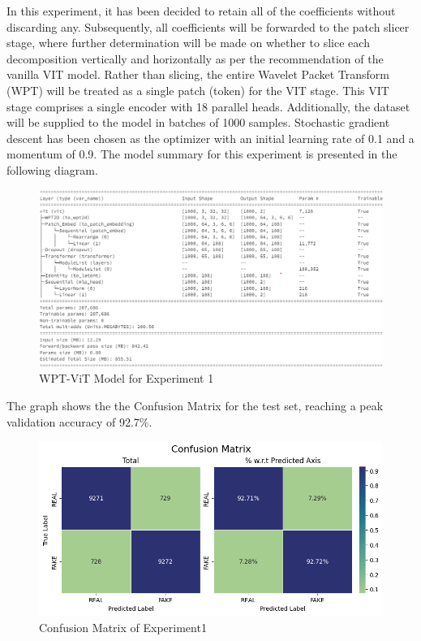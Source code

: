 \documentclass{svproc}
\begin{document}
\noindent
In this experiment, it has been decided to retain all of the coefficients without discarding any. Subsequently, all coefficients will be forwarded to the patch slicer stage, where further determination will be made on whether to slice each decomposition vertically and horizontally as per the recommendation of the vanilla VIT model. Rather than slicing, the entire Wavelet Packet Transform (WPT) will be treated as a single patch (token) for the VIT stage. This VIT stage comprises a single encoder with 18 parallel heads. Additionally, the dataset will be supplied to the model in batches of 1000 samples. Stochastic gradient descent has been chosen as the optimizer with an initial learning rate of 0.1 and a momentum of 0.9. The model summary for this experiment is presented in the following diagram.

\begin{figure}[H]
  \centering
    \includegraphics[width=1.0\linewidth]{figures/exp1_model.png}
    \caption{WPT-ViT Model for Experiment 1}
    \label{fig:exp1_model}
\end{figure}

\noindent 
The graph shows the the Confusion Matrix for the test set, reaching a peak validation accuracy of 92.7\%.

\begin{figure}[H]
  \centering
    \includegraphics[width=0.8\linewidth]{figures/exp1_CFM.png}
    \caption{Confusion Matrix of Experiment1}
    \label{fig:exp1_CFM}
\end{figure}
\end{document}
